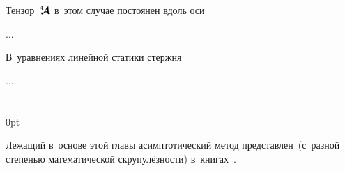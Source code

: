 
\begin{otherlanguage}{russian}

Тензор~${\hspace{.08ex}{^4\hspace{-0.72ex}\bm{\mathcal{A}}}\hspace{.08ex}}$ в~этом случае постоянен вдоль оси

...



\end{otherlanguage}



\begin{otherlanguage}{russian}

В~уравнениях линейной статики стержня

...




\end{otherlanguage}

\section*{\small \wordforbibliography}

\begin{changemargin}{\parindent}{0pt}
\fontsize{10}{12}\selectfont

\begin{otherlanguage}{russian}

Лежащий в~основе этой главы асимптотический метод представлен~(с~разной степенью математической скрупулёзности) в~книгах~\cite{bakhvalov.panasenko, asymptoticanalysisforperiodicstructures, kravchuk.mayboroda.urzhumtsev-polymericandcompositematerials, pobedrya-composites}.

\end{otherlanguage}

\end{changemargin}

